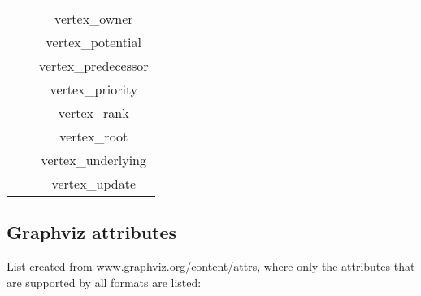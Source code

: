 \begin{table}[h!]
\begin{tabular}{c c c}
                             &                & vertex\_owner              \\
                             &                & vertex\_potential          \\
                             &                & vertex\_predecessor        \\
                             &                & vertex\_priority           \\
                             &                & vertex\_rank               \\
                             &                & vertex\_root               \\
                             &                & vertex\_underlying         \\
                             &                & vertex\_update             \\
    \hline
  \end{tabular}
\end{table}

\subsection{Graphviz attributes}
\label{subsec:Graphviz-attributes}

List created from \url{www.graphviz.org/content/attrs}, 
where only the attributes that are supported by all formats are listed:

